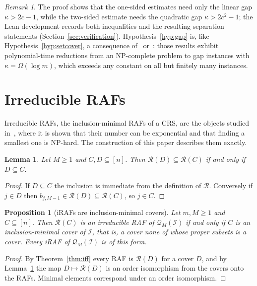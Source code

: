 \documentclass[11pt,a4paper]{article}
\theoremstyle{plain}
\newtheorem{proposition}[theorem]{Proposition}
\newtheorem{lemma}[theorem]{Lemma}
\theoremstyle{definition}
\theoremstyle{remark}
\newtheorem{remark}[theorem]{Remark}
\newcommand{\cQ}{\mathcal{Q}}
\newcommand{\cR}{\mathcal{R}}
\newcommand{\cI}{\mathcal{I}}
\begin{document}
\begin{remark}
The proof shows that the one-sided estimates need only the linear gap $\kappa>2c-1$, while the two-sided estimate needs the quadratic gap $\kappa>2c^2-1$; the Lean development records both inequalities and the resulting separation statements (Section~\ref{sec:verification}). Hypothesis~\ref{hyp:gap} is, like Hypothesis~\ref{hyp:setcover}, a consequence of~\cite{razsafra1997subconstant} or~\cite{dinur2014analytical}: those results exhibit polynomial-time reductions from an NP-complete problem to gap instances with $\kappa=\Omega(\log m)$, which exceeds any constant on all but finitely many instances.
\end{remark}

\section{Irreducible RAFs}\label{sec:irraf}

Irreducible RAFs, the inclusion-minimal RAFs of a CRS, are the objects studied in~\cite{steel2013minimal}, where it is shown that their number can be exponential and that finding a smallest one is NP-hard. The construction of this paper describes them exactly.

\begin{lemma}\label{lem:subset}
Let $M\ge 1$ and $C,D\subseteq[n]$. Then $\cR(D)\subseteq\cR(C)$ if and only if $D\subseteq C$.
\end{lemma}

\begin{proof}
If $D\subseteq C$ the inclusion is immediate from the definition of $\cR$. Conversely if $j\in D$ then $b_{j,M-1}\in\cR(D)\subseteq\cR(C)$, so $j\in C$.
\end{proof}

\begin{proposition}[iRAFs are inclusion-minimal covers]\label{prop:irraf}
Let $m,M\ge 1$ and $C\subseteq[n]$. Then $\cR(C)$ is an irreducible RAF of $\cQ_M(\cI)$ if and only if $C$ is an inclusion-minimal cover of $\cI$, that is, a cover none of whose proper subsets is a cover. Every iRAF of $\cQ_M(\cI)$ is of this form.
\end{proposition}

\begin{proof}
By Theorem~\ref{thm:iff} every RAF is $\cR(D)$ for a cover $D$, and by Lemma~\ref{lem:subset} the map $D\mapsto\cR(D)$ is an order isomorphism from the covers onto the RAFs. Minimal elements correspond under an order isomorphism.
\end{proof}
\end{document}
